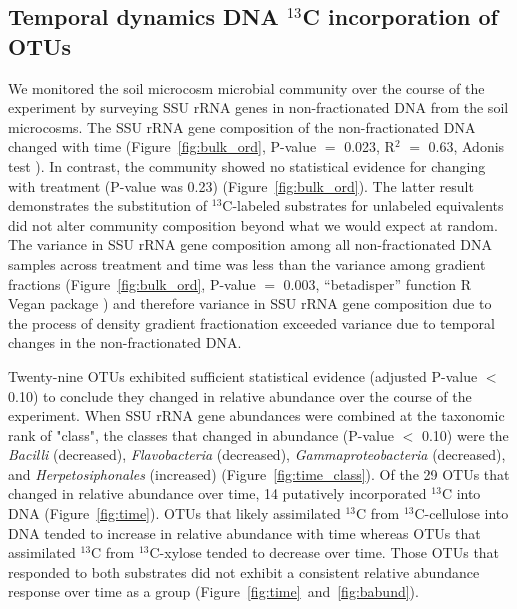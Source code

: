 \subsection{Temporal dynamics DNA $^{13}$C incorporation of OTUs}
We monitored the soil microcosm microbial community over the course of the
experiment by surveying SSU rRNA genes in non-fractionated DNA from the soil
microcosms. The SSU rRNA gene composition of the non-fractionated DNA changed
with time (Figure~\ref{fig:bulk_ord}, P-value $=$ 0.023, R$^{2}$ $=$ 0.63,
Adonis test \citep{Anderson2001a}). In contrast, the community showed no
statistical evidence for changing with treatment (P-value was 0.23)
(Figure~\ref{fig:bulk_ord}). The latter result demonstrates the substitution of
$^{13}$C-labeled substrates for unlabeled equivalents did not alter community
composition beyond what we would expect at random. The variance in
SSU rRNA gene composition among all non-fractionated DNA samples across
treatment and time was less than the variance among gradient fractions
(Figure~\ref{fig:bulk_ord}, P-value $=$ 0.003, “betadisper” function R Vegan
package \citep{oksanen2007vegan}) and therefore variance in SSU rRNA gene
composition due to the process of density gradient fractionation exceeded
variance due to temporal changes in the non-fractionated DNA.

Twenty-nine OTUs exhibited sufficient statistical evidence (adjusted P-value
$<$ 0.10) to conclude they changed in relative abundance over the
course of the experiment. When SSU rRNA gene abundances were combined at
the taxonomic rank of "class", the classes that changed in abundance (P-value
$<$ 0.10) were the \textit{Bacilli} (decreased), \textit{Flavobacteria}
(decreased), \textit{Gammaproteobacteria} (decreased), and
\textit{Herpetosiphonales} (increased) (Figure~\ref{fig:time_class}). Of the 29
OTUs that changed in relative abundance over time, 14 putatively
incorporated $^{13}$C into DNA (Figure~\ref{fig:time}). OTUs that likely
assimilated $^{13}$C from $^{13}$C-cellulose into DNA tended to increase in
relative abundance with time whereas OTUs that assimilated $^{13}$C from
$^{13}$C-xylose tended to decrease over time. Those OTUs that responded to both
substrates did not exhibit a consistent relative abundance response over time
as a group (Figure~\ref{fig:time}~and~\ref{fig:babund}).

